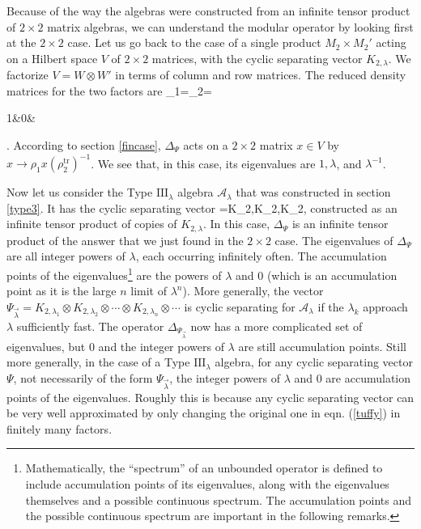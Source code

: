 \documentclass[12pt]{article}
\def\III{{\mathrm{ III}}}
\def\tr{{\mathrm{tr}}}
\def\bp{\begin{pmatrix}}
\def\ep{\end{pmatrix}}
\numberwithin{equation}{section}
\def\A{{\mathcal A}}
\begin{document}
Because of the way the algebras were constructed from an infinite tensor product of $2\times 2$ matrix algebras, we can understand
the modular operator by looking first at the $2\times 2$ case.  Let us go back to the case of a  single product $M_2\times M_2'$ acting
on a Hilbert space $V$ of $2\times 2$ matrices, with the cyclic separating vector $K_{2,\lambda}$.  We factorize $V=W\otimes W'$
in terms of column and row matrices.   The reduced density matrices for the two factors are
\be\label{zeox}\rho_1=\rho_2=\bp 1&0&\lambda\ep. \ee
According to section \ref{fincase}, $\Delta_\Psi$ acts on a $2\times 2 $ matrix $x\in V$ by $x\to \rho_1 x(\rho_2^\tr)^{-1}$.
We see that,  in this case, its eigenvalues are $1,\lambda$, and $\lambda^{-1}$.  

Now let us consider the Type $\III_\lambda$ algebra $\A_\lambda$ that was constructed in section \ref{type3}.  
It has the cyclic separating vector
\be\label{tuffy}\Psi=K_{2,\lambda}\otimes K_{2,\lambda}\otimes \cdots \otimes K_{2,\lambda}\otimes \cdots \ee
constructed as an infinite tensor product of copies of
 $K_{2,\lambda}$.  In this case, $\Delta_\Psi$ is an infinite tensor product of the answer that we just found in the $2\times 2$ case.
The eigenvalues of $\Delta_\Psi$ are all integer powers of $\lambda$, each occurring infinitely often.   The accumulation points
of the eigenvalues\footnote{Mathematically, the
``spectrum'' of an unbounded operator is defined to include accumulation points of its eigenvalues, along with the eigenvalues
themselves and a possible continuous spectrum. The accumulation points and the possible continuous spectrum are important in the
following remarks.}  are the powers of $\lambda$ and $0$ (which is an accumulation point as it is the large $n$ limit of $\lambda^n$).
More generally, the vector $\Psi_{\vec\lambda}=K_{2,\lambda_1}\otimes K_{2,\lambda_2}\otimes \cdots \otimes 
K_{2,\lambda_n}\otimes \cdots $ is cyclic separating for $\A_\lambda$ if the $\lambda_k$ approach $\lambda$ sufficiently fast.
The operator $\Delta_{\Psi_{\vec\lambda}}$ now has a more complicated set of eigenvalues, but 0 and the integer powers of $\lambda$
are  still accumulation points.  Still more generally, in the case of a Type $\III_\lambda$ algebra, for any cyclic
separating vector $\Psi$, not necessarily of the form $\Psi_{\vec\lambda}$,
the integer powers of $\lambda$ and 0 are accumulation points of the eigenvalues.    
Roughly this is because any cyclic separating vector can be very well approximated
by only changing the original one in eqn. (\ref{tuffy}) in finitely many factors.
\end{document}

